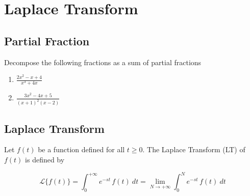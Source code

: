 \chapter{Laplace Transform}

\section{Partial Fraction}

\begin{example}
    Decompose the following fractions as a sum of partial fractions
    \begin{enumerate}
        \item $\displaystyle \frac{2x^2 - x + 4}{x^3 + 4x}$
        \item $\displaystyle \frac{3x^2 -4x + 5}{(x+1)^2(x-2)}$
    \end{enumerate}
\end{example}

\section{Laplace Transform}
    \begin{definition}
        Let $f(t)$ be a function defined for all $t \geq 0$. The Laplace Transform (LT) of 
        $f(t)$ is defined by 

        \begin{equation}
            \mathcal{L}\{ f(t)\} = \int_{0}^{+\infty} e^{-st}\,f(t)\> dt = \lim_{N \to +\infty} \int_{0}^{N} e^{-st}\,f(t)\> dt
        \end{equation}
    \end{definition}

